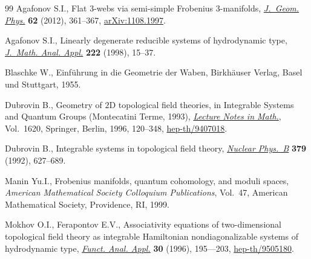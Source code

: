 \documentclass[11pt]{article}
\begin{document}
\begin{thebibliography}{99}
Agafonov S.I., Flat 3-webs via semi-simple {F}robenius 3-manifolds,
  \href{http://dx.doi.org/10.1016/j.geomphys.2011.10.020}{\textit{J.~Geom. Phys.}} \textbf{62} (2012), 361--367, \href{http://arxiv.org/abs/1108.1997}{arXiv:1108.1997}.

Agafonov S.I., Linearly degenerate reducible systems of hydrodynamic type,
  \href{http://dx.doi.org/10.1006/jmaa.1996.5357}{\textit{J.~Math. Anal. Appl.}} \textbf{222} (1998), 15--37.

Blaschke W., Einf\"uhrung in die {G}eometrie der {W}aben, Birkh\"auser Verlag,
  Basel und Stuttgart, 1955.

Dubrovin B., Geometry of {$2$}{D} topological f\/ield theories, in Integrable
  Systems and Quantum Groups ({M}ontecatini {T}erme, 1993), \href{http://dx.doi.org/10.1007/BFb0094793}{\textit{Lecture
  Notes in Math.}}, Vol.~1620, Springer, Berlin, 1996, 120--348,
  \href{http://arxiv.org/abs/hep-th/9407018}{hep-th/9407018}.

Dubrovin B., Integrable systems in topological f\/ield theory, \href{http://dx.doi.org/10.1016/0550-3213(92)90137-Z}{\textit{Nuclear
  Phys.~B}} \textbf{379} (1992), 627--689.

Manin Yu.I., Frobenius manifolds, quantum cohomology, and moduli spaces,
  \textit{American Mathematical Society Colloquium Publications}, Vol.~47,
  American Mathematical Society, Providence, RI, 1999.

Mokhov O.I., Ferapontov E.V., Associativity equations of two-dimensional
  topological f\/ield theory as integrable {H}amiltonian nondiagonalizable
  systems of hydrodynamic type, \href{http://dx.doi.org/10.1007/BF02509506}{\textit{Funct. Anal. Appl.}} \textbf{30} (1996),
  195–--203, \href{http://arxiv.org/abs/hep-th/9505180}{hep-th/9505180}.

\end{thebibliography}
\end{document}
